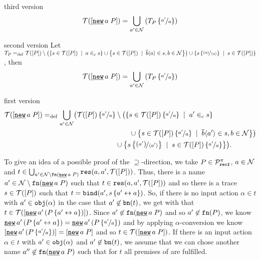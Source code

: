 \begin{conject}
\begin{old}{third version}
			\[\traces[\procres{a}{P}] = \bigcup_{a'\in\names}\left(T_P\subs{a'}{a}\right)\]			
	\end{old}
	\begin{old}{second version}		
		Let $T_P\define\traces[P]\setminus\bigl(\set[a\in_c s]{s\in\traces[P]}\cup\set[\out{b}{a}\in s,b\in\names]{s\in\traces[P]}\bigr)\cup \set[{s\in\traces[P]}]{s\subs{\left(a\right)}{\langle{}a\rangle}}$, then
					\[\traces[\procres{a}{P}] = \bigcup_{a'\in\names}\left(T_P\subs{a'}{a}\right)\]
	\end{old}
	\begin{old}{first version}		
		\begin{align*}
			\traces[\procres{a}{P}] \define \bigcup_{a'\in\names}\bigl(\traces[P]\subs{a'}{a}&\setminus\bigl(\set[a'\in_c s]{s\in\traces[P]\subs{a'}{a}} \\
							& \quad\quad\cup \set[\out{b}{a'}\in s,b\in\names]{s\in\traces[P]\subs{a'}{a}}\bigr) \\
							&\cup \set[{s\in\traces[P]\subs{a'}{a}}]{s\subs{\left(a'\right)}{\langle{}a'\rangle}}\bigr).
		\end{align*}
	\end{old}
\end{conject}

To give an idea of a possible proof of the $\supseteq$-direction, we take $P\in\mathcal P^{\pi}_{\mathtt{recf}}$, $a\in\mathcal N$ and $t\in\bigcup_{a'\in\names\setminus\fn{\procres{a}{P}}}\res{a}{a'}{P}$. Thus, there is a name $a'\in\names\setminus\fn{\procres{a}{P}}$ such that $t\in\res{a}{a'}{P}$ and so there is a trace $s\in\traces[P]$ such that $t=\mathtt{bind}(a',s\left\{a'\leftrightarrow{}a\right\})$. So, if there is no input action $\alpha\in{}t$ with $a'\in\mathtt{obj}(\alpha)$ in the case that $a'\not\in\mathtt{bn}(t)$, we get with  that $t\in\traces[{\procres[()]{a'}{P\transp{a'}{a}}}]$. Since $a'\nin\fn{\procres{a}{P}}$ and so $a'\not\in\mathtt{fn}(P)$, we know $\procres[()]{a'}{P\transp{a'}{a}}=\procres[()]{a'}{P\subs{a'}{a}}$ and by applying $\alpha$-conversion we know $\ec{\procres[()]{a'}{P\subs{a'}{a}}}=\ec{\procres{a}{P}}$ and so $t\in\traces[\procres{a}{P}]$. If there is an input action $\alpha\in{}t$ with $a'\in\mathtt{obj}(\alpha)$ and $a'\not\in\mathtt{bn}(t)$, we assume that we can chose another name $a''\nin\fn{\procres{a}{P}}$ such that for $t$ all premises of  are fulfilled.

